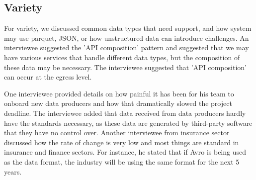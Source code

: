 \documentclass[a4paper,11pt,article,oneside]{memoir}
\begin{document}
\subsection{Variety}

For variety, we discussed common data types that need support, and how system may use parquet, JSON, or how unstructured data can introduce challenges. An interviewee suggested the 'API composition' pattern and suggested that we may have various services that handle different data types, but the composition of these data may be necessary. The interviewee suggested that 'API composition' can occur at the egress level. 

One interviewee provided details on how painful it has been for his team to onboard new data producers and how that dramatically slowed the project deadline. The interviewee added that data received from data producers hardly have the standards necessary, as these data are generated by third-party software that they have no control over. Another interviewee from insurance sector discussed how the rate of change is very low and most things are standard in insurance and finance sectors. For instance, he stated that if Avro is being used as the data format, the industry will be using the same format for the next 5 years. 








\end{document}
